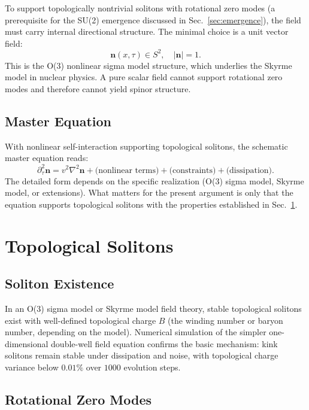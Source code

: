 ﻿\documentclass[11pt,a4paper]{article}
\begin{document}
To support topologically nontrivial solitons with rotational zero modes (a prerequisite for the SU(2) emergence discussed in Sec.~\ref{sec:emergence}), the field must carry internal directional structure. The minimal choice is a unit vector field:
\begin{equation}
\mathbf{n}(x, \tau) \in S^2, \quad |\mathbf{n}| = 1.
\end{equation}
This is the O(3) nonlinear sigma model structure, which underlies the Skyrme model in nuclear physics. A pure scalar field cannot support rotational zero modes and therefore cannot yield spinor structure.

\subsection{Master Equation}

With nonlinear self-interaction supporting topological solitons, the schematic master equation reads:
\begin{equation}
\partial_\tau^2 \mathbf{n} = v^2 \nabla^2 \mathbf{n} + \text{(nonlinear terms)} + \text{(constraints)} + \text{(dissipation)}.
\end{equation}
The detailed form depends on the specific realization (O(3) sigma model, Skyrme model, or extensions). What matters for the present argument is only that the equation supports topological solitons with the properties established in Sec.~\ref{sec:solitons}.

\section{Topological Solitons}
\label{sec:solitons}

\subsection{Soliton Existence}

In an O(3) sigma model or Skyrme model field theory, stable topological solitons exist with well-defined topological charge $B$ (the winding number or baryon number, depending on the model). Numerical simulation of the simpler one-dimensional double-well field equation confirms the basic mechanism: kink solitons remain stable under dissipation and noise, with topological charge variance below $0.01\%$ over $1000$ evolution steps.

\subsection{Rotational Zero Modes}
\end{document}
